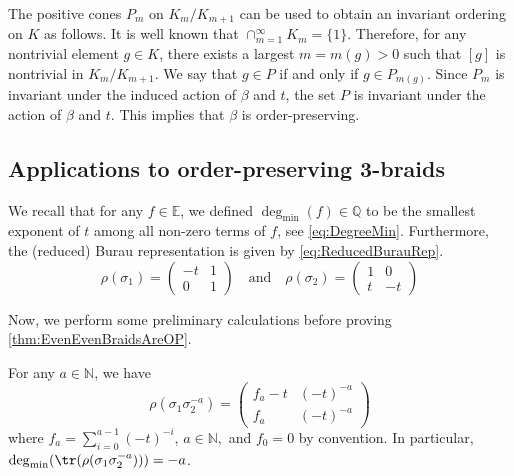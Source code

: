 \documentclass{amsart}
\makeatletter
\renewenvironment{proof}[1][\proofname]{%
   \par\pushQED{\qed}\normalfont%
   \topsep6\p@\@plus6\p@\relax
   \trivlist\item[\hskip\labelsep\bfseries#1\@addpunct{.}]%
   \ignorespaces
}{%
   \popQED\endtrivlist\@endpefalse
}
\makeatother
\begin{document}
\begin{proof}[Proof of \cref{thm:OPViaBurauRep}]
    The positive cones $P_m$ on $K_m/K_{m+1}$ can be used to obtain an invariant ordering on $K$ as follows. It is well known that $\cap_{m=1}^\infty K_m = \{1\}$. Therefore, for any nontrivial element $g \in K$, there exists a largest $m = m(g)>0$ such that $[g]$ is nontrivial in $K_m/K_{m+1}$. We say that $g \in P$ if and only if $g \in P_{m(g)}$. Since $P_m$ is invariant under the induced action of $\beta$ and $t$, the set $P$ is invariant under the action of $\beta$ and $t$. This implies that $\beta$ is order-preserving. 
\end{proof}

\subsection{Applications to order-preserving 3-braids}
\label{subsec:OP3Braid}
We recall that for any $f \in \mathbb{E}$, we defined $\deg_{\min}(f) \in \mathbb{Q}$ to be the smallest exponent of $t$ among all non-zero terms of $f$, see \cref{eq:DegreeMin}. Furthermore, the (reduced) Burau representation is given by \cref{eq:ReducedBurauRep}.
    \[
    \rho(\sigma_1) = \begin{pmatrix}
        -t & 1 \\ 0 & 1
    \end{pmatrix} 
    \quad \text{and} \quad 
    \rho(\sigma_2) = \begin{pmatrix}
        1 & 0 \\ t & -t
    \end{pmatrix}
    \]

Now, we perform some preliminary calculations before proving \cref{thm:EvenEvenBraidsAreOP}.

\begin{lem}
    \label{lem:BaseCase}
    For any $a \in \mathbb{N}$, we have
    \[
    \rho(\sigma_1\sigma_2^{-a}) = \begin{pmatrix}
       f_a - t & (-t)^{-a} \\f_a  & (-t)^{-a}
    \end{pmatrix}
    \]
    where $f_a = \sum\limits_{i=0}^{a-1}(-t)^{-i}$, $a \in \mathbb{N},$ and $f_{0} = 0$ by convention. In particular, $\deg_{\min}(\tr(\rho(\sigma_1\sigma_2^{-a}))) = -a$.
\end{lem}
\end{document}
